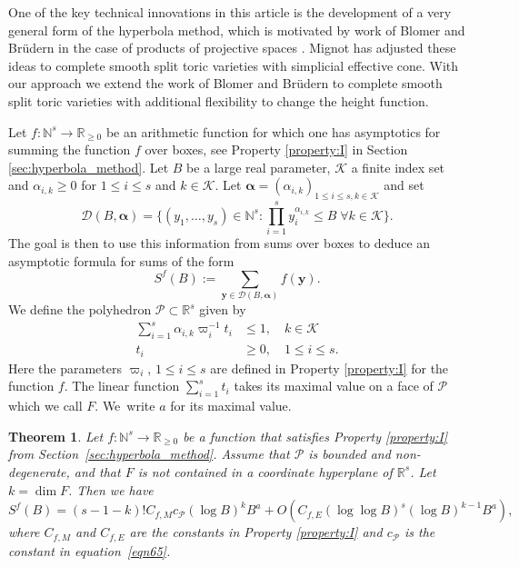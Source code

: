 \documentclass[11pt]{article}
\numberwithin{equation}{section}
\let\ts\textstyle
\newcommand{\cD}{\mathcal{D}}
\newcommand{\cBalp}{\cD(B,\bfalp)}
\newcommand{\bfy}{\boldsymbol{y}}
\newcommand{\bfalp}{\boldsymbol{\alpha}}
\newcommand{\calK}{\mathcal{K}}
\newcommand{\calP}{\mathcal{P}}
\newcommand\NN{\mathbb{N}}
\newcommand{\N}{\mathbb{N}}
\newcommand\R{\mathbb{R}}
\newtheorem{theorem}{Theorem}
\theoremstyle{definition}
\numberwithin{theorem}{section}
\begin{document}
One of the key technical innovations in this article is the development of a very general form of the hyperbola method, which is motivated by work of Blomer and Brüdern in the case of products of projective spaces \cite{BB}. Mignot \cite{mignot2} has adjusted these ideas to complete smooth split toric varieties with simplicial effective cone.
With our approach we extend the work of Blomer and Brüdern to complete smooth split toric varieties with additional flexibility to change the height function.\par
Let $f: \N^s\rightarrow \R_{\geq 0}$ be an arithmetic function for which one has asymptotics for summing the function $f$ over boxes, see Property \ref{property:I} in Section \ref{sec:hyperbola_method}. Let $B$ be a large real parameter, $\calK$ a finite index set and $\alpha_{i,k}\geq 0$ for $1\leq i\leq s$ and $k\in \calK$. Let $\bfalp=(\alpha_{i,k})_{1\leq i\leq s,k\in\calK}$ and set\vspace*{-3pt}
\[\ts
\cBalp=\bigl\{(y_1,\dots,y_s)\in\NN^s:\prod_{i=1}^sy_i^{\alpha_{i,k}}\leq B\;\forall k\in\calK\bigr\}.
\]
The goal is then to use this information from sums over boxes to deduce an asymptotic formula for sums of the form\vspace*{-5pt}
\begin{equation*}
S^{f}(B):=\sum_{\bfy\in\cBalp}f(\bfy).
\end{equation*}
We define the polyhedron $\calP \subset \R^s$ given by\vspace*{-5pt}
\begin{align*}
\sum_{i=1}^s \alpha_{i,k} \varpi_i^{-1} t_i&\leq 1, \quad k\in \calK
\\[-5pt]
\tag*{and}
t_i&\geq 0,\quad 1\leq i\leq s.
\end{align*}
Here the parameters $\varpi_i$, $1\leq i\leq s$ are defined in Property \ref{property:I} for the function $f$. The linear function $\sum_{i=1}^s t_i$ takes its maximal value on a face of $\calP$ which we call $F$. We~write $a$ for its maximal value.

\begin{theorem}\label{lemhyp3}
Let $f:\N^s\rightarrow \R_{\geq 0}$ be a function that satisfies Property \ref{property:I} from Section~\ref{sec:hyperbola_method}.
Assume that $\calP$ is bounded and non-degenerate, and that $F$ is not contained in a coordinate hyperplane of $\R^s$. Let $k=\dim F$. Then we have\vspace*{-3pt}
\[
S^f(B)= (s-1-k)! C_{f,M}c_{\calP} (\log B)^kB^{a}
+O\left(C_{f,E} (\log \log B)^{s} (\log B)^{k-1} B^{a} \right),
\]
where $C_{f,M}$ and $C_{f,E}$ are the constants in Property \ref{property:I} and $c_\calP$ is the constant in equation~\eqref{eqn65}.
\end{theorem}
\end{document}
